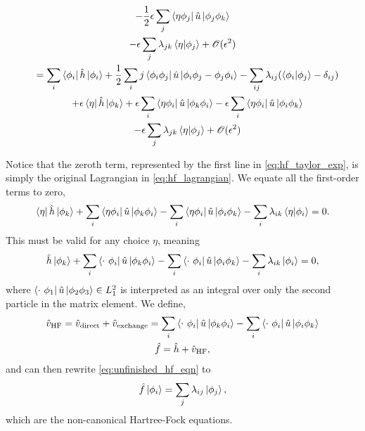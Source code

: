 \begin{gather}
\begin{gathered}
            - \frac{1}{2} \epsilon \sum_j \bra{\eta\phi_j} \hat{u}
                \ket{\phi_j \phi_k} \\
            - \epsilon \sum_j \lambda_{jk}\braket{\eta}{\phi_j}
            + \mathscr{O}(\epsilon^2) 
        \end{gathered} \\
        \quad
        \begin{gathered}
            \label{eq:hf_taylor_exp}
            =
            \sum_i \bra{\phi_i} \hat{h} \ket{\phi_i} 
            + \frac{1}{2} \sum_ij \bra{\phi_i \phi_j} \hat{u} 
                    \ket{\phi_i \phi_j - \phi_j \phi_i}
            - \sum_{ij}\lambda_{ij}(\braket{\phi_i}{\phi_j} - \delta_{ij}) \\
            + \epsilon\bra{\eta} \hat{h} \ket{\phi_k}
            + \epsilon \sum_i \bra{\eta\phi_i} \hat{u} \ket{\phi_k \phi_i}
            - \epsilon \sum_i \bra{\eta\phi_i} \hat{u} \ket{\phi_i \phi_k} \\
            - \epsilon \sum_j \lambda_{jk}\braket{\eta}{\phi_j}
            + \mathscr{O}(\epsilon^2) 
        \end{gathered}
    \end{gather}

Notice that the zeroth term, represented by the first line in \autoref{eq:hf_taylor_exp},
is simply the original Lagrangian in \autoref{eq:hf_lagrangian}. We equate all the 
first-order terms to zero,
\begin{equation}
    \bra{\eta} \hat{h} \ket{\phi_k} 
    + \sum_i \bra{\eta \phi_i} \hat{u} \ket{\phi_k\phi_i}
    - \sum_i \bra{\eta \phi_i} \hat{u} \ket{\phi_i\phi_k}
    - \sum_i \lambda_{ik} \braket{\eta}{\phi_i} = 0.
\end{equation}
This must be valid for any choice $\eta$, meaning
\begin{equation}
    \label{eq:unfinished_hf_eqn}
    \hat{h} \ket{\phi_k} 
    + \sum_i \bra{\cdot\ \phi_i} \hat{u} \ket{\phi_k\phi_i}
    - \sum_i \bra{\cdot\ \phi_i} \hat{u} \ket{\phi_i\phi_k}
    - \sum_i \lambda_{ik} \ket{\phi_i} = 0,
\end{equation}
where $\bra{\cdot\ \phi_1} \hat{u} \ket{\phi_2 \phi_3} \in L_1^2$ is interpreted
as an integral over only the second particle in the matrix element. We define,
\begin{gather}
    \hat{v}_{\text{HF}} = \hat{v}_{\text{direct}} + \hat{v}_{\text{exchange}}
        =\sum_i \bra{\cdot\ \phi_i} \hat{u} \ket{\phi_k\phi_i}
        -\sum_i \bra{\cdot\ \phi_i} \hat{u} \ket{\phi_i\phi_k} \\
    \hat{f} = \hat{h} + \hat{v}_{\text{HF}},
\end{gather}
and can then rewrite \autoref{eq:unfinished_hf_eqn} to 
\begin{equation}
    \label{eq:noncanonical_hf_eqns}
    \hat{f}\ket{\phi_i} = \sum_j \lambda_{ij}\ket{\phi_j},
\end{equation} 
which are the non-canonical Hartree-Fock equations.


